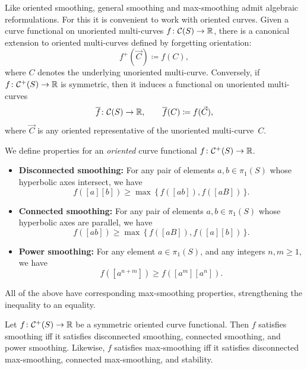 Like oriented smoothing, general smoothing and max-smoothing admit
algebraic reformulations.
For this it is convenient to work with oriented curves.
Given a curve functional on unoriented multi-curves
$f \colon \mathcal{C}(S) \to \mathbb{R}$, there is a canonical extension to
oriented multi-curves defined by forgetting orientation:
\begin{equation}
\label{eq:oriented_extension}
f^+(\vec C) \coloneqq f(C),
\end{equation}
where $C$ denotes the underlying unoriented multi-curve.
Conversely, if $f \colon \mathcal{C}^+(S) \to \mathbb{R}$ is symmetric, then it induces a functional on unoriented multi-curves
\begin{equation}
\label{eq:unoriented_destriction}
\overline{f} \colon \mathcal{C}(S) \to \mathbb{R}, 
\qquad
\overline{f}(C) \coloneqq f(\vec C),
\end{equation}
where $\vec C$ is any oriented representative of the unoriented
multi-curve~$C$.


\begin{definition}
\label{def:smoothing_for_oriented}
  We define properties for an \emph{oriented} curve functional $f \colon \mathcal{C}^+(S) \to \mathbb{R}$.
\begin{itemize}
\item \textbf{Disconnected smoothing:} For any pair of elements $a,b \in \pi_1(S)$ whose hyperbolic axes intersect, we have 
  \[ f([a] [b]) \geq \max\,\{\,f([ab]), f([aB])\,\}. \]
\item \textbf{Connected smoothing:} For any pair of elements $a,b \in
  \pi_1(S)$ whose hyperbolic axes are parallel, we have \[ f([ab]) \geq \max\,\{\,f([aB]), f([a] [b])\,\}. \]
 \item \textbf{Power smoothing:} For any element $a \in \pi_1(S)$, and any integers $n,m\geq 1$, we have
\begin{equation} f([a^{n+m}]) \geq f([a^{ m}][a^{ n}]).\label{eq:power_smoothing_unoriented}\end{equation}
\end{itemize}
All of the above have corresponding max-smoothing
properties, strengthening the inequality to an equality.
\end{definition}

\begin{lemma}
\label{lem:smoothing-alg}
  Let $f \colon \mathcal{C}^+(S)\to \mathbb{R}$ be a symmetric oriented curve functional. Then $f$ satisfies smoothing iff  it satisfies disconnected smoothing, connected smoothing, and power smoothing.
  Likewise, $f$ satisfies max-smoothing iff it satisfies disconnected max-smoothing, connected max-smoothing, and stability.
\end{lemma}

